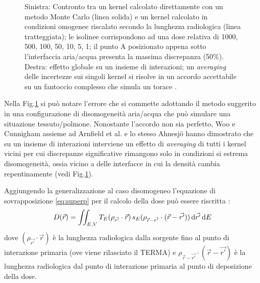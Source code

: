 {\begin{figure}[!t]
\caption{Sinistra: Contronto tra un kernel calcolato direttamente con un metodo Monte Carlo (linea solida) e un kernel calcolato in condizioni omogenee riscalato secondo la lunghezza radiologica (linea tratteggiata); le isolinee corrispondono ad una dose relativa di 1000, 500, 100, 50, 10, 5, 1; il punto A posizionato appena sotto l'interfaccia aria/acqua presenta la massima discrepanza (50\%). Destra: effetto globale su un insieme di interazioni; un \textit{averaging} delle incertezze sui singoli kernel si risolve in un accordo accettabile su un fantoccio complesso che simula un torace \cite{Woo1990,Arnfield2000,Ahnesjo1989}.}
\label{fig:kern_dens}
\end{figure}
Nella Fig.\ref{fig:kern_dens} si può notare l'errore che si commette adottando il metodo suggerito in una configurazione di disomogeneità aria/acqua che può simulare una situazione tessuto/polmone. Nonostante l'accordo non sia perfetto, Woo e Cunnigham \cite{Woo1990} assieme ad Arnfield et al. \cite{Arnfield2000} e lo stesso Ahnesj\"{o} \cite{Ahnesjo1989} hanno dimostrato che su un insieme di interazioni interviene un effetto di \textit{averaging} di tutti i kernel vicini per cui discrepanze significative rimangono solo in condizioni si estrema disomogeneità, ossia vicino a delle interfacce in cui la densità cambia repentinamente (vedi Fig.\ref{fig:kern_dens}).

Aggiungendo  la generalizzazione al caso disomogeneo l'equazione di sovrapposizione \eqref{eq:superp} per il calcolo della dose può essere riscritta \cite{Khan2010}:
\begin{equation}
D(\vec{r}) = \iint_{E,V} T_E(\rho_{\vec{r'}} \cdot \vec{r})\, s_E(\rho_{\vec{r}-\vec{r'}}\cdot (\vec{r}-\vec{r'}))\,\text{d}\vec{r'} \,\text{d} E
\end{equation}
dove $(\rho_{\vec{r'}} \cdot \vec{r})$ è la lunghezza radiologica dalla sorgente fino al punto di interazione primaria (ove viene rilasciato il TERMA) e $\rho_{\vec{r}-\vec{r'}}\cdot (\vec{r}-\vec{r'})$ è la lunghezza radiologica dal punto di interazione primaria al punto di deposizione della dose.

}

